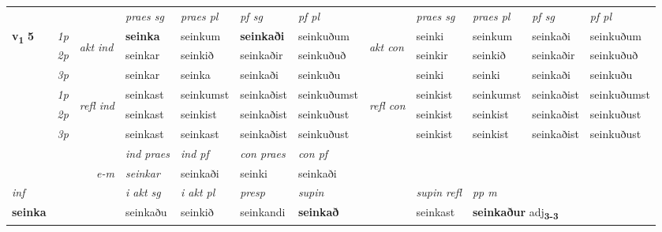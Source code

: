 \begin{longtable}[l]{X>{\footnotesize\itshape}llXXXXlXXXX}
\midrule

 & &   & \textit{praes sg}  & \textit{praes pl}    & \textit{ pf sg} & \textit{pf pl} & & \textit{praes sg}  & \textit{praes pl}    & \textit{pf sg} & \textit{pf pl }  \\ \cmidrule{4-7} \cmidrule{9-12}
 \multirow{2}{*}{{{\textbf{v{\textsubscript{1}}} \Large{\textbf{5}}}}}  & 1p & \multirow{3}{*}{\begin{turn}{90}\textit{akt ind}\end{turn}} & \textbf{seinka} & seinkum & \textbf{seinkaði} & seinkuðum & \multirow{3}{*}{\begin{turn}{90}\textit{akt con}\end{turn}} &seinki & seinkum & seinkaði & seinkuðum\\*
 & 2p &  &  seinkar  & seinkið & seinkaðir & seinkuðuð & & seinkir & seinkið & seinkaðir & seinkuðuð \\*
 & 3p &  & seinkar & seinka & seinkaði & seinkuðu & & seinki & seinki& seinkaði & seinkuðu \\*
\cmidrule{4-7} \cmidrule{9-12}
 & 1p & \multirow{3}{*}{\begin{turn}{90}\textit{refl ind}\end{turn}}  & seinkast & seinkumst & seinkaðist & seinkuðumst & \multirow{3}{*}{\begin{turn}{90}\textit{refl con}\end{turn}}  &seinkist & seinkumst & seinkaðist & seinkuðumst \\*
 & 2p &  & seinkast & seinkist & seinkaðist & seinkuðust & &seinkist & seinkist & seinkaðist & seinkuðust \\*
 & 3p  & & seinkast & seinkast & seinkaðist & seinkuðust & & seinkist & seinkist& seinkaðist & seinkuðust \\*
\cmidrule{4-7} \cmidrule{9-12}

   && &  \textit{ind praes} & \textit{ind pf} & \textit{con praes} & \textit{con pf} \\*
\multicolumn{3}{r}{\textit{e-m}} & seinkar & seinkaði & seinki & seinkaði \\*

\cmidrule{4-7}
   {\textit{inf}} & &  & \textit{i akt sg} & \textit{i akt pl}   & \textit{presp} & \textit{supin} && \textit{supin refl} & \textit{pp m} \\*
  {\textbf{seinka}} & && seinkaðu  & seinkið   & seinkandi &  \textbf{seinkað} && seinkast & \multicolumn{2}{l}{\textbf{seinkaður} adj\textbf{\textsubscript{3-3}}} \\*


\end{longtable}
